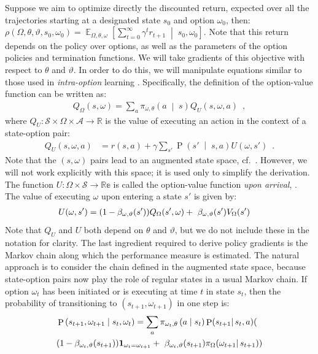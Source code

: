 \documentclass[letterpaper]{article}
\def\given{\;\middle\vert\;}
\def\indicator{\mathbf{1}}
\DeclareMathOperator*{\expectation}{\mathbb{E}}
\DeclareMathOperator{\prob}{P}
\def\actions{\mathcal{A}}
\def\options{\Omega}
\def\states{\mathcal{S}}
\def\defeq{=}\newcommand{\deriv}[2][]{\frac{\partial#1}{\partial#2}}
\def\option{\omega}
\begin{document}
Suppose we aim to optimize directly the discounted return, expected over all
the trajectories starting at a designated state $s_0$ and option $\omega_0$, then:
$\rho(\Omega, \theta, \vartheta, s_0, \omega_0) \defeq \expectation_{\Omega, \theta, \omega}\left[\sum_{t=0}^\infty\gamma^{t} r_{t+1} \given s_0, \omega_0\right]$.
Note that this  return depends on the policy over options, as well as the
parameters of the option policies and termination functions.
We will take gradients of this objective with respect to $\theta$ and $\vartheta$.
In order to do this, we will manipulate equations similar to those used in
\textit{intra-option} learning \cite[section 8]{Sutton1999opt}.
Specifically, the definition of the option-value function can be written as:
\begin{align}
Q_\options(s, \option)  =\sum_a \pi_{\option, \theta}\left( a \given s \right)Q_U(s, \option, a)\enspace , \label{eq:q}
\end{align}
where $Q_U : \states \times \options \times \actions \to \mathbb{R}$ is the value of executing an action in the context of a state-option pair:
\begin{align}
Q_U(s, \omega, a) &\defeq r(s,a) + \gamma \sum_{s'} \prob\left( s' \given s, a \right)U(\omega, s') \enspace . \label{eq:qswa}
\end{align}
Note that the $(s,\omega)$ pairs lead to an
augmented state space, cf.~\cite{levy2011}.  However, we will not work
explicitly with this space; it is used only to simplify the derivation.
The function $U:\Omega \times \states \rightarrow \mathbb{Re}$ is called the
option-value function \textit{upon arrival}, \cite[equation 20]{Sutton1999opt}.
The value of executing $\omega$ upon entering a state $s'$ is given by:
\begin{align}
\hspace{-1em}U(\omega, s')&\defeq (1 - \beta_{\omega, \vartheta}(s')) Q_\Omega(s', \omega) + \
\beta_{\omega, \vartheta}(s') V_\Omega(s') \hspace{-8pt}\label{eq:u}
\end{align}
Note that $Q_U$ and $U$ both depend on $\theta$ and $\vartheta$, but we do not
include these in the notation for clarity.
The last ingredient required to derive policy gradients is the Markov chain along which
the performance measure is estimated. The natural approach is to consider the
chain defined in the augmented state space, because state-option pairs now play
the role of regular states in a usual Markov chain. If option $\omega_t$ has been
initiated or is executing at time $t$ in state $s_t$,
then the probability of transitioning to $(s_{t+1}, \omega_{t+1})$ in
one step is:
\begin{align}
&\prob\left(s_{t+1}, \omega_{t+1} \given s_t, \omega_t \right) = \sum_{a} \pi_{\omega_t,\theta}\left(a \given s_t \right) \prob(s_{t+1} |\, s_t, a)( \notag\\
&(1 - \beta_{\omega_t,\vartheta}(s_{t+1}))\indicator_{\omega_{t}=\omega_{t+1}} + \
\beta_{\omega_{t},\vartheta}(s_{t+1})\pi_\Omega(\omega_{t+1} |\, s_{t+1})) \label{eq:chainstructure}
\end{align}
\end{document}
